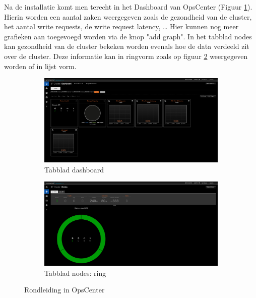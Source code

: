 Na de installatie komt men terecht in het Dashboard van OpsCenter (Figuur \ref{fig:cas_opscenter_tour_dashboard}).
Hierin worden een aantal zaken weergegeven zoals de gezondheid van de cluster, het aantal write requests, de write request latency, \ldots
Hier kunnen nog meer grafieken aan toegevoegd worden via de knop "add graph".
In het tabblad nodes kan gezondheid van de cluster bekeken worden evenals hoe de data verdeeld zit over de cluster.
Deze informatie kan in ringvorm zoals op figuur \ref{fig:cas_opscenter_tour_nodes} weergegeven worden of in lijst vorm.

\begin{figure}[H]
	\centering
	\begin{subfigure}{.49\textwidth}
		\centering
		\includegraphics[width=.99\linewidth]{img/4_1_installatie_cassandra/2_Tour_1_Dashboard}
		\caption{Tabblad dashboard}
		\label{fig:cas_opscenter_tour_dashboard}
	\end{subfigure}
	\begin{subfigure}{.49\textwidth}
		\centering
		\includegraphics[width=.99\linewidth]{img/4_1_installatie_cassandra/2_Tour_2_Nodes}
		\caption{Tabblad nodes: ring}
		\label{fig:cas_opscenter_tour_nodes}
	\end{subfigure}
	\caption{Rondleiding in OpsCenter}
	\label{fig:cas_opscenter_tour}
\end{figure}

